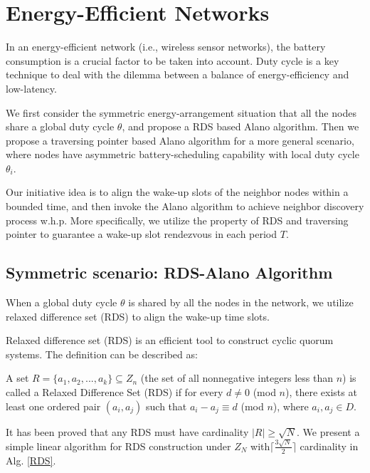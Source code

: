 \section{Energy-Efficient Networks}
\label{EEN}
In an energy-efficient network (i.e., wireless sensor networks), 
the battery consumption is a crucial factor to be taken into account.
Duty cycle is a key technique to deal with the dilemma between a 
balance of energy-efficiency and low-latency.


We first consider the symmetric energy-arrangement situation
that  all the nodes share a global duty cycle $\theta$, and propose
a RDS based Alano algorithm. Then we propose a traversing pointer 
based Alano algorithm for a more general scenario, 
where nodes have asymmetric battery-scheduling 
capability with local duty cycle $\theta_i$.


Our initiative idea is to align the wake-up slots of the neighbor nodes within a bounded time,
and then invoke the Alano algorithm to achieve neighbor discovery process w.h.p. 
More specifically, we utilize the property of RDS and traversing pointer to guarantee 
a wake-up slot rendezvous in each period $T$. 


\subsection{Symmetric scenario: RDS-Alano Algorithm}


When a global duty cycle $\theta$ is shared by all the nodes in the network,
we utilize relaxed difference set (RDS) to align the wake-up time slots.


Relaxed difference set (RDS) is an efficient tool to 
construct cyclic quorum systems\cite{jiang2005quorum,luk1997two}. The definition can be
described as:
\begin{definition}
A set $R=\{a_1,a_2,...,a_k\} \subseteq Z_n$ (the set of all nonnegative integers less than $n$) 
is called a Relaxed Difference Set (RDS) if for every $d \neq 0$ (mod $n$), 
there exists at least one ordered pair $(a_i,a_j)$ such that $a_i - a_j \equiv d$ (mod $n$), where $a_i,a_j \in D$.
\end{definition}


It has been proved that 
any RDS must have cardinality $|R| \geq \sqrt{N}$\cite{luk1997two}.
We present a simple linear algorithm for RDS construction under $Z_N$
with$\lceil \frac{3\sqrt{N}}{2}  \rceil$ cardinality in Alg. \ref{RDS}. 


